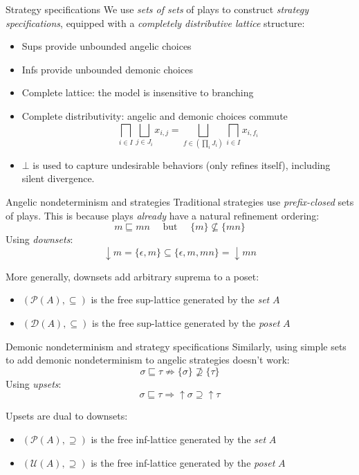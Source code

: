 \documentclass{beamer}
\begin{document}
\begin{frame}{Strategy specifications} %
We use \emph{sets of sets} of plays
to construct \emph{strategy specifications},
equipped with a
\emph{completely distributive lattice}
structure:
\begin{itemize}
  \item Sups provide unbounded angelic choices
  \item Infs provide unbounded demonic choices
  \item Complete lattice: the model is insensitive to branching
  \item Complete distributivity: angelic and demonic choices commute
  \[
      \bigsqcap_{i \in I} \bigsqcup_{j \in J_i} x_{i,j} =
      \bigsqcup_{f \in (\prod_i J_i)} \bigsqcap_{i \in I} x_{i, f_i}
  \]
  \item $\bot$ is used to capture undesirable behaviors (only refines itself),
    including silent divergence.
\end{itemize}
\end{frame}

\begin{frame}{Angelic nondeterminism and strategies} %
  Traditional strategies use
  \emph{prefix-closed} sets of plays.
  This is because plays \emph{already} have
  a natural refinement ordering:
  \[
    m \sqsubseteq mn
    \quad \mbox{ but } \quad
    \{m\} \nsubseteq \{mn\}
  \]
  Using \emph{downsets}:
  \[
    {\downarrow} m = \{\epsilon, m\} \subseteq \{\epsilon, m, mn\} = {\downarrow} mn
  \]

  More generally,
  downsets add arbitrary suprema to a poset:
  \begin{itemize}
    \item $(\mathcal{P}(A), {\subseteq})$ is the
      free sup-lattice generated by the \emph{set} $A$
    \item $(\mathcal{D}(A), {\subseteq})$ is the
      free sup-lattice generated by the \emph{poset} $A$
  \end{itemize}
\end{frame}

\begin{frame}{Demonic nondeterminism and strategy specifications} %
  Similarly,
  using simple sets to add demonic nondeterminism to angelic strategies
  doesn't work:
  \[
    \sigma \sqsubseteq \tau \nRightarrow
    \{\sigma\} \nsupseteq \{\tau\}
  \]
  Using \emph{upsets}:
  \[
    \sigma \sqsubseteq \tau \Rightarrow
    {\uparrow} \sigma \supseteq {\uparrow} \tau
  \]

  Upsets are dual to downsets:
  \begin{itemize}
    \item $(\mathcal{P}(A), {\supseteq})$ is the
      free inf-lattice generated by the \emph{set} $A$
    \item $(\mathcal{U}(A), {\supseteq})$ is the
      free inf-lattice generated by the \emph{poset} $A$
  \end{itemize}
\end{frame}
\end{document}
